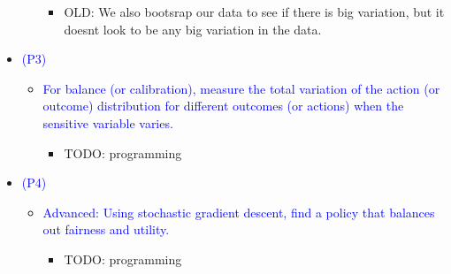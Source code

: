 \begin{itemize}
\begin{itemize}
\begin{itemize}
                \item OLD: We also bootsrap our data to see if there is big variation, but it doesnt look to be any big variation in the data.
            \end{itemize}
        \end{itemize}
    \item \textcolor{blue}{(P3)}
        \begin{itemize}
            \item \textcolor{blue}{For balance (or calibration), measure the total variation of the action (or outcome) distribution for different outcomes (or actions) when the sensitive variable varies.}
            \begin{itemize}
                \item TODO: programming
            \end{itemize}
        \end{itemize}
    \item \textcolor{blue}{(P4)}
        \begin{itemize}
            \item \textcolor{blue}{Advanced: Using stochastic gradient descent, find a policy that balances out fairness and utility.}
            \begin{itemize}
                \item TODO: programming
            \end{itemize}
        \end{itemize}
\end{itemize}